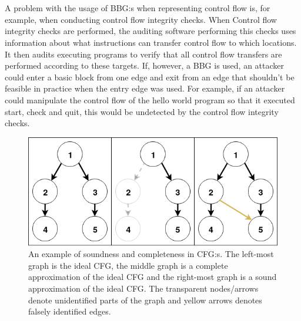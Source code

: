 \documentclass{kththesis}
\begin{document}
\\ \\
A problem with the usage of BBG:s when representing control flow is, for example, when conducting control flow integrity checks. When Control flow integrity checks are performed, the auditing software performing this checks uses information about what instructions can transfer control flow to which locations. It then audits executing programs to verify that all control flow transfers are performed according to these targets. If, however, a BBG is used, an attacker could enter a basic block from one edge and exit from an edge that shouldn't be feasible in practice when the entry edge was used. For example, if an attacker could manipulate the control flow of the hello world program so that it executed start, check and quit, this would be undetected by the control flow integrity checks. 
\begin{figure}[t]
    \centering
    \includegraphics[scale=0.6]{Images/SoundCompleteGraph.png}
    \caption[An example of soundness and completeness in CFG:s.]{An example of soundness and completeness in CFG:s. The left-most graph is the ideal CFG, the middle graph is a complete approximation of the ideal CFG and the right-most graph is a sound approximation of the ideal CFG. The transparent nodes/arrows denote unidentified parts of the graph and yellow arrows denotes falsely identified edges.}
    \label{fig:SoundCompleteGraph}
\end{figure}
\end{document}
